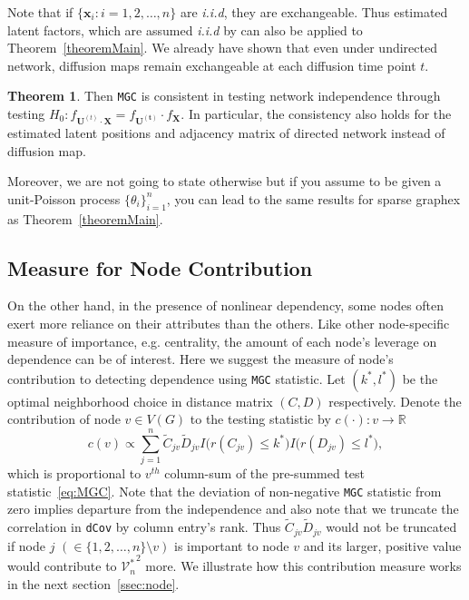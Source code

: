 \documentclass[12pt]{article}
\theoremstyle{definition}
\newtheorem{theorem}{Theorem}[section]
\begin{document}
Note that if $\{ \mathbf{x}_{i} : i = 1,2,\ldots, n \}$ are \textit{i.i.d}, they are exchangeable. Thus estimated latent factors, which are assumed \textit{i.i.d} by \cite{fosdick2015testing} can also be applied to Theorem~\ref{theoremMain}. We already have shown that even under undirected network, diffusion maps remain exchangeable at each diffusion time point $t$. 
\begin{theorem}
	\label{theorem2}
	Then \texttt{MGC} is consistent in testing network independence through testing $H_{0}: f_{\mathbf{U}^{(t)} \cdot \mathbf{X}  }  = f_{\mathbf{U^{(t)}}} \cdot f_{\mathbf{X}}$. In particular, the consistency also holds for the estimated latent positions and adjacency matrix of directed network instead of diffusion map.
\end{theorem}		
Moreover, we are not going to state otherwise but if you assume to be given a unit-Poisson process $\{ \theta_{i} \}_{i=1}^{n}$, you can lead to the same results for sparse graphex as Theorem~\ref{theoremMain}. 

\subsection{Measure for Node Contribution}

On the other hand, in the presence of nonlinear dependency, some nodes often exert more reliance on their attributes than the others. Like other node-specific measure of importance, e.g. centrality,  the amount of each node's leverage on dependence can be of interest. Here we suggest the measure of node's contribution to detecting dependence using \texttt{MGC} statistic. Let $(k^{*}, l^{*})$ be the optimal neighborhood choice in distance matrix $(C, D)$ respectively.  Denote the contribution of node $v \in V(G)$ to the testing statistic by  $c(\cdot) : v \rightarrow \mathbb{R}$
\begin{equation}
\label{contribution}
c(v) \propto \sum\limits_{j=1}^{n} \tilde{C}_{j v} \tilde{D}_{j v} I \big(  r (C_{j v}) \leq k^{*}  \big) I \big( r (D_{ j v }) \leq l^{*} \big), 
\end{equation}
which is proportional to $v^{th}$ column-sum of the pre-summed test statistic~\ref{eq:MGC}. Note that the deviation of non-negative \texttt{MGC} statistic from zero implies departure from the independence and also note that we truncate the correlation in \texttt{dCov} by column entry's rank. Thus $\tilde{C}_{jv} \tilde{D}_{jv}$ would not be truncated if node $j$ $(\in \{ 1,2, \ldots, n \} \setminus v )$ is important to node $v$ and its larger, positive value would contribute to ${\mathcal{V}^{*}_{n}}^2$ more. We illustrate how this contribution measure works in the next section~\ref{ssec:node}. 
\end{document}
